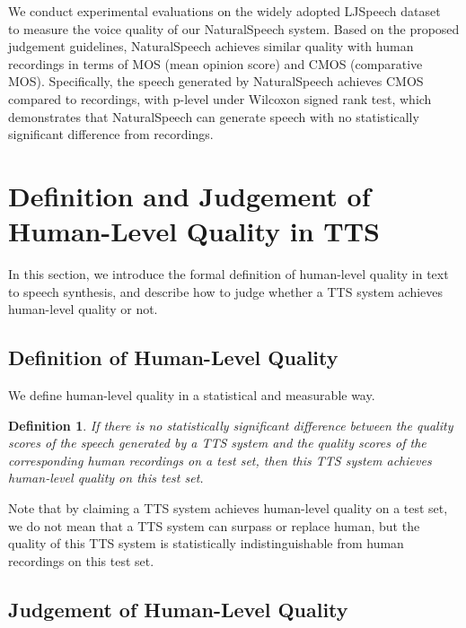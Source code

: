 \documentclass{article}
\theoremstyle{definition}
\newtheorem{definition}{Definition}
\def\myname{NaturalSpeech}
\begin{document}
We conduct experimental evaluations on the widely adopted LJSpeech dataset~\cite{ljspeech17} to measure the voice quality of our \myname{} system. Based on the proposed judgement guidelines, \myname{} achieves similar quality with human recordings in terms of MOS (mean opinion score) and CMOS (comparative MOS). Specifically, the speech generated by \myname{} achieves  CMOS compared to recordings, with p-level  under Wilcoxon signed rank test, which demonstrates that \myname{} can generate speech with no statistically significant difference from recordings.





\section{Definition and Judgement of Human-Level Quality in TTS}
\label{sec_def_judge}

In this section, we introduce the formal definition of human-level quality in text to speech synthesis, and describe how to judge whether a TTS system achieves human-level quality or not. 

\subsection{Definition of Human-Level Quality}
We define human-level quality in a statistical and measurable way.
\begin{definition}
\textit{If there is no statistically significant difference between the quality scores of the speech generated by a TTS system and the quality scores of the corresponding human recordings on a test set, then this TTS system achieves human-level quality on this test set.}
\label{def_onpar}
\end{definition}

Note that by claiming a TTS system achieves human-level quality on a test set, we do not mean that a TTS system can surpass or replace human, but the quality of this TTS system is statistically indistinguishable from human recordings on this test set.


\subsection{Judgement of Human-Level Quality}
\end{document}
